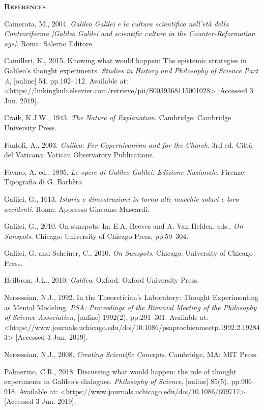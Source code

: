 \documentclass[a4paper]{article}
\begin{document}
{\centering\bfseries\scshape
References
\par}

Camerota, M., 2004. \textit{Galileo Galilei e la cultura scientifica nell’età della Controriforma [Galileo Galilei and
scientific culture in the Counter-Reformation age]}. Roma: Salerno Editore.

Camilleri, K., 2015. Knowing what would happen: The epistemic strategies in Galileo’s thought experiments.
\textit{Studies in History and Philosophy of Science Part A}, [online] 54, pp.102–112. Available at:
{\textless}https://linkinghub.elsevier.com/retrieve/pii/S0039368115001028{\textgreater} [Accessed 3 Jun. 2019].

Craik, K.J.W., 1943. \textit{The Nature of Explanation}. Cambridge: Cambridge University Press.

Fantoli, A., 2003. \textit{Galileo: For Copernicanism and for the Church}. 3rd ed. Città del Vaticana: Vatican
Observatory Publications.

Favaro, A. ed., 1895. \textit{Le opere di Galileo Galilei: Edizione Nazionale}. Firenze: Tipografia di G. Barbèra.

Galilei, G., 1613. \textit{Istoria e dimostrazioni in torno alle macchie solari e loro accidenti}. Roma: Appresso
Giacomo Mascardi.

Galilei, G., 2010. On sunspots. In: E.A. Reeves and A. Van Helden, eds., \textit{On Sunspots}. Chicago: University of
Chicago Press, pp.59–304.

Galilei, G. and Scheiner, C., 2010. \textit{On Sunspots}. Chicago: University of Chicago Press.

Heilbron, J.L., 2010. \textit{Galileo}. Oxford: Oxford University Press.

Nersessian, N.J., 1992. In the Theoretician’s Laboratory: Thought Experimenting as Mental Modeling. \textit{PSA:
Proceedings of the Biennial Meeting of the Philosophy of Science Association}, [online] 1992(2), pp.291–301. Available
at: {\textless}https://www.journals.uchicago.edu/doi/10.1086/psaprocbienmeetp.1992.2.192843{\textgreater} [Accessed 3
Jun. 2019].

Nersessian, N.J., 2008. \textit{Creating Scientific Concepts}. Cambridge, MA: MIT Press.

Palmerino, C.R., 2018. Discussing what would happen: the role of thought experiments in Galileo’s dialogues.
\textit{Philosophy of Science}, [online] 85(5), pp.906–918. Available at:
{\textless}https://www.journals.uchicago.edu/doi/10.1086/699717{\textgreater} [Accessed 3 Jun. 2019].
\end{document}
